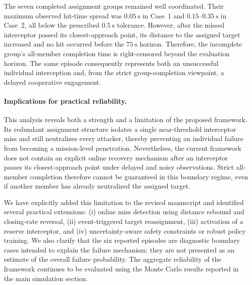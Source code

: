 \documentclass[10pt]{article}
\begin{document}
The seven completed assignment groups remained well coordinated. Their
maximum observed hit-time spread was \(0.05~\mathrm{s}\) in Case~1 and
\(0.15\)--\(0.35~\mathrm{s}\) in Case~2, all below the prescribed
\(0.5~\mathrm{s}\) tolerance. However, after the missed interceptor passed its
closest-approach point, its distance to the assigned target increased and no
hit occurred before the \(75~\mathrm{s}\) horizon. Therefore, the incomplete
group's all-member completion time is right-censored beyond the evaluation
horizon. The same episode consequently represents both an unsuccessful
individual interception and, from the strict group-completion viewpoint, a
delayed cooperative engagement.

\paragraph{Implications for practical reliability.}
This analysis reveals both a strength and a limitation of the proposed
framework. Its redundant assignment structure isolates a single
near-threshold interceptor miss and still neutralizes every attacker, thereby
preventing an individual failure from becoming a mission-level penetration.
Nevertheless, the current framework does not contain an explicit online
recovery mechanism after an interceptor passes its closest-approach point
under delayed and noisy observations. Strict all-member completion therefore
cannot be guaranteed in this boundary regime, even if another member has
already neutralized the assigned target.

We have explicitly added this limitation to the revised manuscript and
identified several practical extensions: (i) online miss detection using
distance rebound and closing-rate reversal, (ii) event-triggered target
reassignment, (iii) activation of a reserve interceptor, and
(iv) uncertainty-aware safety constraints or robust policy training. We also
clarify that the six reported episodes are diagnostic boundary cases intended
to explain the failure mechanism; they are not presented as an estimate of the
overall failure probability. The aggregate reliability of the framework
continues to be evaluated using the Monte Carlo results reported in the main
simulation section.
\end{document}
